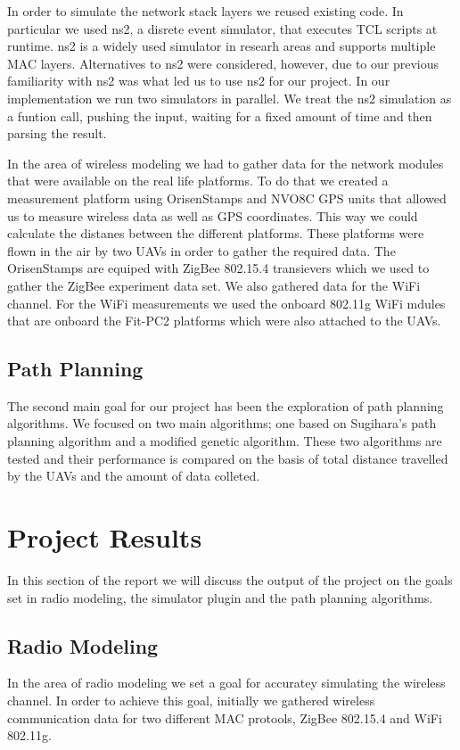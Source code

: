 In order to simulate the network stack layers we reused existing code. In
particular we used ns2, a disrete event simulator, that executes TCL scripts at
runtime. ns2 is a widely used simulator in researh areas and supports multiple
MAC layers. Alternatives to ns2 were considered, however, due to our previous
familiarity with ns2 was what led us to use ns2 for our project. In our
implementation we run two simulators in parallel. We treat the ns2 simulation
as a funtion call, pushing the input, waiting for a fixed amount of time and
then parsing the result.

In the area of wireless modeling we had to gather data for the network modules
that were available on the real life platforms. To do that we created a
measurement platform using OrisenStamps and NVO8C GPS units that allowed us to
measure wireless data as well as GPS coordinates. This way we could calculate
the distanes between the different platforms. These platforms were flown in the
air by two UAVs in order to gather the required data. The OrisenStamps are
equiped with ZigBee 802.15.4 transievers which we used to gather the ZigBee
experiment data set. We also gathered data for the WiFi channel. For the WiFi
measurements we used the onboard 802.11g WiFi mdules that are onboard the
Fit-PC2 platforms which were also attached to the UAVs.

\subsection{Path Planning}
The second main goal for our project has been the exploration of path planning
algorithms. We focused on two main algorithms; one based on Sugihara's path
planning algorithm and a modified genetic algorithm. These two algorithms are
tested and their performance is compared on the basis of total distance
travelled by the UAVs and the amount of data colleted.

\section{Project Results}
In this section of the report we will discuss the output of the project on the
goals set in radio modeling, the simulator plugin and the path planning
algorithms.

\subsection{Radio Modeling}
In the area of radio modeling we set a goal for accuratey simulating the
wireless channel. In order to achieve this goal, initially we gathered wireless
communication data for two different MAC protools, ZigBee 802.15.4 and WiFi
802.11g.

